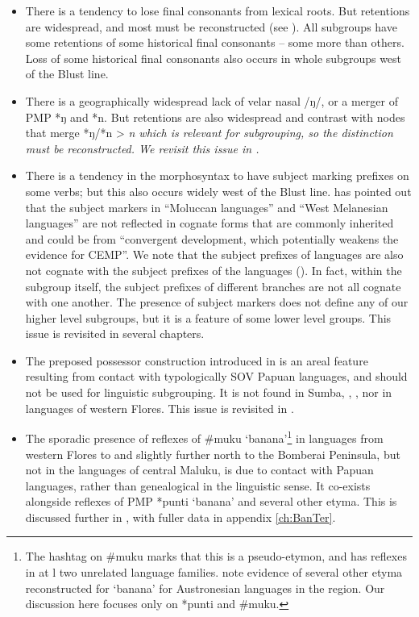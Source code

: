 \begin{itemize}
\item There is a tendency to lose final consonants from lexical roots.
			But retentions are widespread,
			and most must be reconstructed (see ).
			All subgroups have some retentions of some historical final consonants -- some more than others.
			Loss of some historical final consonants also occurs in whole subgroups west of the Blust line.
\item There is a geographically widespread lack of velar nasal /ŋ/,
			or a merger of PMP *ŋ and *n.
			But retentions are also widespread
			and contrast with nodes that merge *ŋ/*n > \it{n} which is relevant for subgrouping,
			so the distinction must be reconstructed.
			We revisit this issue in .
\item There is a tendency in the morphosyntax to have subject marking prefixes on some verbs;
			but this also occurs widely west of the Blust line.
			\citet[25]{Adelaar2005} has pointed out that the subject markers in “Moluccan languages”
			and “West Melanesian languages” are not reflected in cognate forms that are commonly inherited
			and could be from “convergent development,
			which potentially weakens the evidence for CEMP”.
			We note that the subject prefixes of  languages are also not cognate with the subject
			prefixes of the  languages ().
			In fact, within the  subgroup itself,
			the subject prefixes of different branches are not all cognate with one another.
			The presence of subject markers does not define any of our higher level subgroups,
			but it is a feature of some lower level groups.
			This issue is revisited in several chapters.
\item The preposed possessor construction introduced in 
			is an areal feature resulting from contact
			with typologically SOV Papuan languages,
			and should not be used for linguistic subgrouping.
			It is not found in Sumba,
			, , nor in languages of western Flores.
			This issue is revisited in .
\item The sporadic presence of reflexes of {\#}muku ‘banana’\footnote{
				The hashtag on {\#}muku marks that this
				is a pseudo-etymon, and has reflexes in at l two unrelated language families.
				\citet{DonohueDenham2009} note evidence of several other etyma
				reconstructed for ‘banana’ for Austronesian languages in the region.
				Our discussion here focuses only on *punti
				and {\#}muku.}
			in languages from western Flores to
			 and slightly further north to the Bomberai Peninsula,
			but not in the languages of central Maluku,
			is due to contact with Papuan languages,
			rather than genealogical in the linguistic sense.
			 It co-exists alongside reflexes of PMP *punti ‘banana’
			and several other etyma.
			This is discussed further in ,
			with fuller data in appendix \ref{ch:BanTer}.
\end{itemize}


